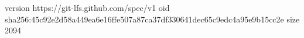 version https://git-lfs.github.com/spec/v1
oid sha256:45c92e2d58a449ea6e16ffe507a87ca37df330641dec65c9edc4a95e9b15cc2e
size 2094
